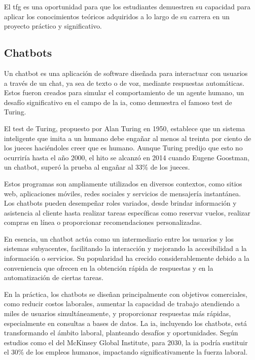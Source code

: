 El \acrshort{tfg} es una oportunidad para que los estudiantes demuestren su capacidad para aplicar los conocimientos teóricos adquiridos a lo largo de su carrera en un proyecto práctico y significativo.

\subsection{Chatbots}

Un chatbot es una aplicación de software diseñada para interactuar con usuarios a través de un chat, ya sea de texto o de voz, mediante respuestas automáticas. Estos fueron creados para simular el comportamiento de un agente humano, un desafío significativo en el campo de la \acrlong{ia}, como demuestra el famoso test de Turing.

El test de Turing, propuesto por Alan Turing en 1950, establece que un sistema inteligente que imita a un humano debe engañar al menos al treinta por ciento de los jueces haciéndoles creer que es humano. Aunque Turing predijo que esto no ocurriría hasta el año 2000, el hito se alcanzó en 2014 cuando Eugene Goostman, un chatbot, superó la prueba al engañar al 33\% de los jueces.

Estos programas son ampliamente utilizados en diversos contextos, como sitios web, aplicaciones móviles, redes sociales y servicios de mensajería instantánea. Los chatbots pueden desempeñar roles variados, desde brindar información y asistencia al cliente hasta realizar tareas específicas como reservar vuelos, realizar compras en línea o proporcionar recomendaciones personalizadas.

En esencia, un chatbot actúa como un intermediario entre los usuarios y los sistemas subyacentes, facilitando la interacción y mejorando la accesibilidad a la información o servicios. Su popularidad ha crecido considerablemente debido a la conveniencia que ofrecen en la obtención rápida de respuestas y en la automatización de ciertas tareas.

En la práctica, los chatbots se diseñan principalmente con objetivos comerciales, como reducir costos laborales, aumentar la capacidad de trabajo atendiendo a miles de usuarios simultáneamente, y proporcionar respuestas más rápidas, especialmente en consultas a bases de datos. La \acrlong{ia}, incluyendo los chatbots, está transformando el ámbito laboral, planteando desafíos y oportunidades. Según estudios como el del McKinsey Global Institute, para 2030, la \acrlong{ia} podría sustituir el 30\% de los empleos humanos, impactando significativamente la fuerza laboral.

